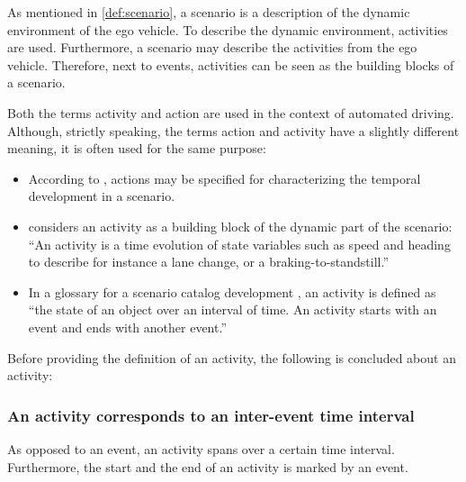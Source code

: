 As mentioned in \cref{def:scenario}, a scenario is a description of the dynamic environment of the ego vehicle. To describe the dynamic environment, activities are used. Furthermore, a scenario may describe the activities from the ego vehicle. Therefore, next to events, activities can be seen as the building blocks of a scenario.

\cbstart
Both the terms activity \cite{geyer2014, elrofai2018scenario, miller2015distraction, childress2015using, catapult2018musicc, sigsim2019glossary} and action \cite{geyer2014, ulbrich2015, bagschik2017ontology} are used in the context of automated driving. Although, strictly speaking, the terms action and activity have a slightly different meaning, it is often used for the same purpose:
\begin{itemize}
	\item According to \textcite{ulbrich2015}, actions may be specified for characterizing the temporal development in a scenario.
	\item \textcite{elrofai2018scenario} considers an activity as a building block of the dynamic part of the scenario: ``An activity is a time evolution of state variables such as speed and heading to describe for instance a lane change, or a braking-to-standstill.''
	\item In a glossary for a scenario catalog development \cite{catapult2018musicc}, an activity is defined as ``the state of an object over an interval of time. An activity starts with an event and ends with another event.''
\end{itemize}
\cbend

Before providing the definition of an activity, the following is concluded about an activity:

\subsubsection{An activity corresponds to an inter-event time interval}
As opposed to an event, an activity spans over a certain time interval. Furthermore, the start and the end of an activity is marked by an event.

